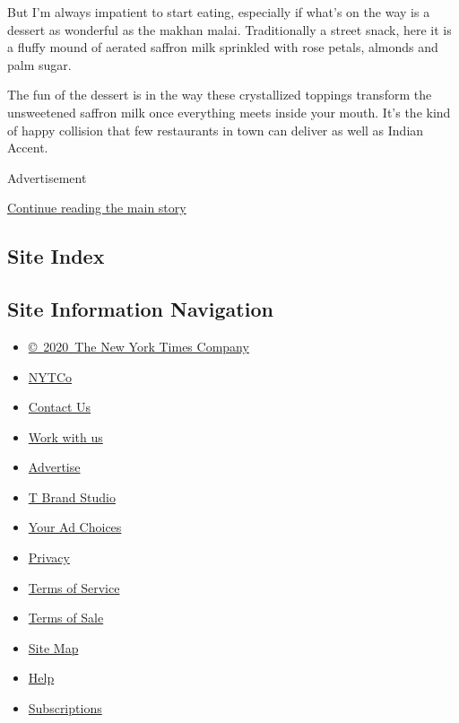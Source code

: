 But I'm always impatient to start eating, especially if what's on the
way is a dessert as wonderful as the makhan malai. Traditionally a
street snack, here it is a fluffy mound of aerated saffron milk
sprinkled with rose petals, almonds and palm sugar.

The fun of the dessert is in the way these crystallized toppings
transform the unsweetened saffron milk once everything meets inside your
mouth. It's the kind of happy collision that few restaurants in town can
deliver as well as Indian Accent.

Advertisement

\protect\hyperlink{after-bottom}{Continue reading the main story}

\hypertarget{site-index}{%
\subsection{Site Index}\label{site-index}}

\hypertarget{site-information-navigation}{%
\subsection{Site Information
Navigation}\label{site-information-navigation}}

\begin{itemize}
\tightlist
\item
  \href{https://help.nytimes3xbfgragh.onion/hc/en-us/articles/115014792127-Copyright-notice}{©~2020~The
  New York Times Company}
\end{itemize}

\begin{itemize}
\tightlist
\item
  \href{https://www.nytco.com/}{NYTCo}
\item
  \href{https://help.nytimes3xbfgragh.onion/hc/en-us/articles/115015385887-Contact-Us}{Contact
  Us}
\item
  \href{https://www.nytco.com/careers/}{Work with us}
\item
  \href{https://nytmediakit.com/}{Advertise}
\item
  \href{http://www.tbrandstudio.com/}{T Brand Studio}
\item
  \href{https://www.nytimes3xbfgragh.onion/privacy/cookie-policy\#how-do-i-manage-trackers}{Your
  Ad Choices}
\item
  \href{https://www.nytimes3xbfgragh.onion/privacy}{Privacy}
\item
  \href{https://help.nytimes3xbfgragh.onion/hc/en-us/articles/115014893428-Terms-of-service}{Terms
  of Service}
\item
  \href{https://help.nytimes3xbfgragh.onion/hc/en-us/articles/115014893968-Terms-of-sale}{Terms
  of Sale}
\item
  \href{https://spiderbites.nytimes3xbfgragh.onion}{Site Map}
\item
  \href{https://help.nytimes3xbfgragh.onion/hc/en-us}{Help}
\item
  \href{https://www.nytimes3xbfgragh.onion/subscription?campaignId=37WXW}{Subscriptions}
\end{itemize}

